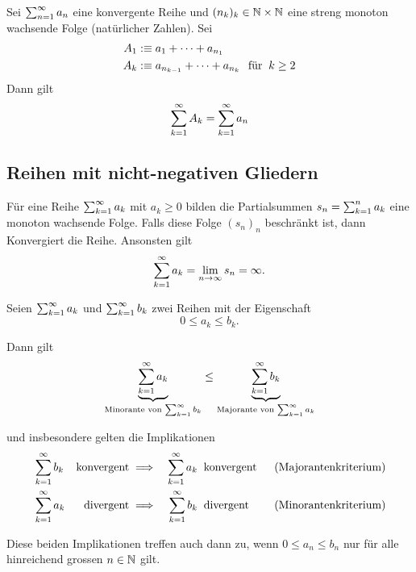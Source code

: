 \begin{thm}
	Sei $\sumninfty a_n$ eine konvergente Reihe und $(n_k)_k \in \nat \times \nat$ eine streng monoton wachsende Folge (natürlicher Zahlen).
	Sei 
	\begin{equation}
		\begin{aligned}
			A_1 &: \equiv a_1 + \cdots + a_{n_1} \\
			A_k &: \equiv a_{n_{k-1}} + \cdots + a_{n_k} \fuer k \geq 2
		\end{aligned}
	\end{equation}
	Dann gilt
	\begin{equation}
		\sumkinfty A_k = \sumkinfty a_n
	\end{equation}
\end{thm}

\subsection{Reihen mit nicht-negativen Gliedern}

\begin{thm}
	Für eine Reihe $\sumkinfty a_k$ mit $a_k \geq 0$ bilden die Partialsummen $s_n=\sumkn a_k$ eine monoton wachsende Folge. Falls diese Folge $(s_n)_n$ beschränkt ist, dann Konvergiert die Reihe. Ansonsten gilt
	\begin{equation}
		\sumkinfty a_k = \limninfty s_n = \infty.
	\end{equation}	
\end{thm}

\begin{thm}[Vergleichssatz]
	
	Seien $\sumkinfty a_k$ und $\sumkinfty b_k$ zwei Reihen mit der Eigenschaft 
	\begin{equation}
		0\leq a_k \leq b_k.
	\end{equation}
	
	Dann gilt 
	\begin{equation}
	 	\underbrace{\sumkinfty a_k}_{\text{Minorante von $\sumkinfty b_k$}}  \leq \underbrace{\sumkinfty b_k}_{\text{Majorante von $\sumkinfty a_k$}} 
	\end{equation} 
	
	und insbesondere gelten die Implikationen
	\begin{equation}
		\begin{aligned}
			&\sumkinfty b_k
			&\text{konvergent} 
			&\implies 
			&\sumkinfty a_k 
			&\mytext{konvergent} 
			&\text{(Majorantenkriterium)} \\
			&\sumkinfty a_k
			&\text{divergent} 
			&\implies 
			&\sumkinfty b_k 
			&\mytext{divergent} 
			&\text{(Minorantenkriterium)}
		\end{aligned}
	\end{equation}
	
	Diese beiden Implikationen treffen auch dann zu, wenn $0\leq a_n \leq b_n$ nur für alle hinreichend grossen $n \in \nat$ gilt.
\end{thm}

